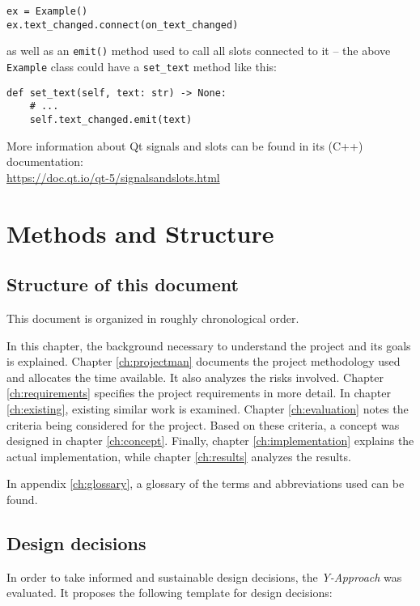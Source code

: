 \begin{verbatim}
ex = Example()
ex.text_changed.connect(on_text_changed)
\end{verbatim}

as well as an \verb|emit()| method used to call all slots connected to it -- the
above \verb|Example| class could have a \verb|set_text| method like this:

\begin{verbatim}
def set_text(self, text: str) -> None:
    # ...
    self.text_changed.emit(text)
\end{verbatim}

More information about Qt signals and slots can be found in its (C++)
documentation: \\
\url{https://doc.qt.io/qt-5/signalsandslots.html}

\section{Methods and Structure}
\subsection{Structure of this document}
This document is organized in roughly chronological order.

In this chapter, the background necessary to understand the
project and its goals is explained. Chapter \ref{ch:projectman} documents the
project methodology used and allocates the time available.
It also analyzes the risks involved. Chapter \ref{ch:requirements} specifies the
project requirements in more detail. In chapter \ref{ch:existing}, existing
similar work is examined. Chapter \ref{ch:evaluation} notes the criteria being
considered for the project. Based on these criteria, a concept was designed in chapter
\ref{ch:concept}. Finally, chapter \ref{ch:implementation} explains the actual
implementation, while chapter \ref{ch:results} analyzes the results.

In appendix \ref{ch:glossary}, a glossary of the terms and abbreviations used
can be found.

\subsection{Design decisions}
In order to take informed and sustainable design decisions, the
\emph{Y-Approach} \autocite{yapproach} was evaluated. It proposes the following
template for design decisions:


